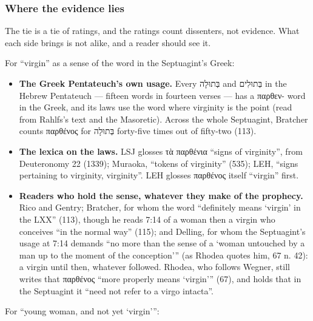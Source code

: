 \documentclass[11pt]{article}
\begin{document}
\subsubsection*{Where the evidence lies}
The tie is a tie of ratings, and the ratings count dissenters, not evidence. What each side brings is not alike, and a reader should see it.

For “virgin” as a sense of the word in the Septuagint’s Greek:

\begin{itemize}
  \item \textbf{The Greek Pentateuch’s own usage.} Every בְּתוּלָה and בְּתוּלִים in the Hebrew Pentateuch — fifteen words in fourteen verses — has a παρθεν- word in the Greek, and its laws use the word where virginity is the point (read from Rahlfs’s text and the Masoretic). Across the whole Septuagint, Bratcher counts παρθένος for בְּתוּלָה forty-five times out of fifty-two (113).
  \item \textbf{The lexica on the laws.} LSJ glosses τὰ παρθένια “signs of virginity”, from Deuteronomy 22 (1339); Muraoka, “tokens of virginity” (535); LEH, “signs pertaining to virginity, virginity”. LEH glosses παρθένος itself “virgin” first.
  \item \textbf{Readers who hold the sense, whatever they make of the prophecy.} Rico and Gentry; Bratcher, for whom the word “definitely means ‘virgin’ in the LXX” (113), though he reads 7:14 of a woman then a virgin who conceives “in the normal way” (115); and Delling, for whom the Septuagint’s usage at 7:14 demands “no more than the sense of a ‘woman untouched by a man up to the moment of the conception’” (as Rhodea quotes him, 67 n. 42): a virgin until then, whatever followed. Rhodea, who follows Wegner, still writes that παρθένος “more properly means ‘virgin’” (67), and holds that in the Septuagint it “need not refer to a virgo intacta”.
\end{itemize}
For “young woman, and not yet ‘virgin’”:
\end{document}
